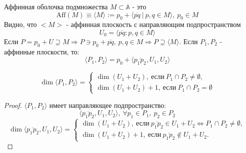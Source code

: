 \begin{definition}
    Аффинная оболочка подмножества $M\subset \mathbb{A}$ - это
    \[\text{Aff}(M)\equiv \langle M \rangle:=p_0+\langle\overline{pq} \ | \ p,q\in M\rangle,\ p_0\in M\]
    Видно, что $<M>$ - аффинная плоскость с направляющим подпространством  
    \[U_0=\langle\overline{pq}: p,q\in M\rangle\]
    Если $P=p_0+U\supseteq M \Longrightarrow P\ni p_0+\overline{pq},\ p,q\in M \Longrightarrow P\supseteq \langle M \rangle$.
    Если $P_1, P_2$ - аффинные плоскости, то:
    \[\langle P_1,P_2 \rangle=p_0+\langle \overline{p_1p_2}, U_1, U_2 \rangle\]
\end{definition} 
\begin{theorem}
    \[\dim{\langle P_1,P_2 \rangle}=\begin{cases}
        \dim(U_1+U_2),\ \text{если}\ P_1\cap P_2\ne \emptyset,\\
        \dim(U_1+U_2)+1,\ \text{если}\ P_1\cap P_2= \emptyset
    \end{cases}\]
\end{theorem}
\begin{proof}
    $\langle P_1,P_2 \rangle$ имеет направляющее подпространство:
    \[\langle \overline{p_1p_2}, U_1, U_2 \rangle,\ \forall p_1\in P_1,\ p_2\in P_2\]
    \[\dim{\langle \overline{p_1p_2}, U_1, U_2 \rangle}=\begin{cases}
        \dim(U_1+U_2),\ \text{если}\ \overline{p_1p_2}\in U_1+U_2 \Longleftrightarrow P_1\cap P_2\ne \emptyset,\\
        \dim(U_1+U_2)+1,\ \text{если}\ \overline{p_1p_2}\not\in U_1+U_2.
    \end{cases}\]
\end{proof}





